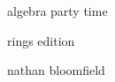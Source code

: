 \thispagestyle{empty}

\vspace{4cm}

\begin{center}
\Large algebra party time

\large rings edition
\end{center}

\vspace{10cm}

\begin{center}
nathan bloomfield
\end{center}
